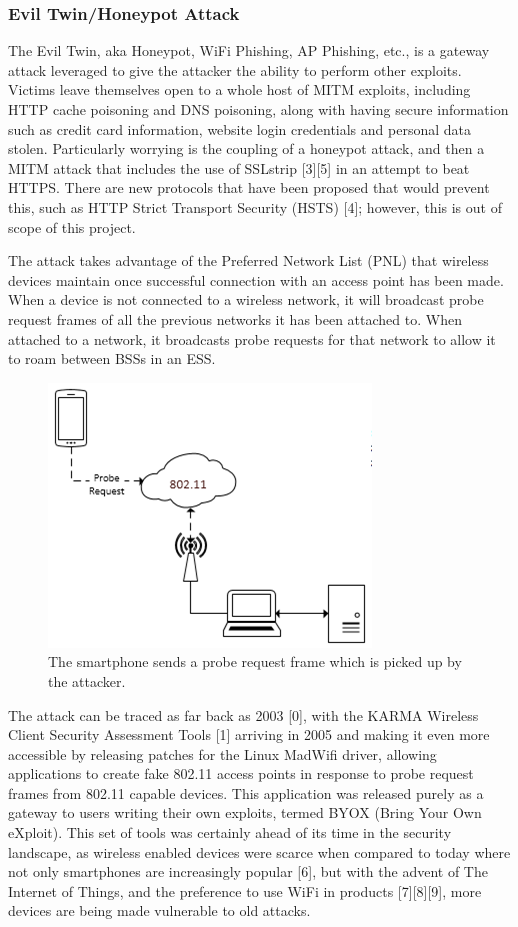 \clearpage
\subsubsection{Evil Twin/Honeypot Attack}
\label{sec:honeypot}
The Evil Twin, aka Honeypot, WiFi Phishing, AP Phishing, etc., is a gateway attack leveraged to give the attacker the ability to perform other exploits. Victims leave themselves open to a whole host of MITM exploits, including HTTP cache poisoning and DNS poisoning, along with having secure information such as credit card information, website login credentials and personal data stolen. Particularly worrying is the coupling of a honeypot attack, and then a MITM attack that includes the use of SSLstrip [3][5] in an attempt to beat HTTPS. There are new protocols that have been proposed that would prevent this, such as HTTP Strict Transport Security (HSTS) [4]; however, this is out of scope of this project.

The attack takes advantage of the Preferred Network List (PNL) that wireless devices maintain once successful connection with an access point has been made. When a device is not connected to a wireless network, it will broadcast probe request frames of all the previous networks it has been attached to. When attached to a network, it broadcasts probe requests for that network to allow it to roam between BSSs in an ESS. 

\begin{figure}[h!]
\centering\includegraphics{research/attackvectors/figures/honeypot.png}
\caption{The smartphone sends a probe request frame which is picked up by the attacker.}
\end{figure}

The attack can be traced as far back as 2003 [0], with the KARMA Wireless Client Security Assessment Tools [1] arriving in 2005 and making it even more accessible by releasing patches for the Linux MadWifi driver, allowing applications to create fake 802.11 access points in response to probe request frames from 802.11 capable devices. This application was released purely as a gateway to users writing their own exploits, termed BYOX (Bring Your Own eXploit). This set of tools was certainly ahead of its time in the security landscape, as wireless enabled devices were scarce when compared to today where not only smartphones are increasingly popular [6], but with the advent of The Internet of Things, and the preference to use WiFi in products [7][8][9], more devices are being made vulnerable to old attacks.  

